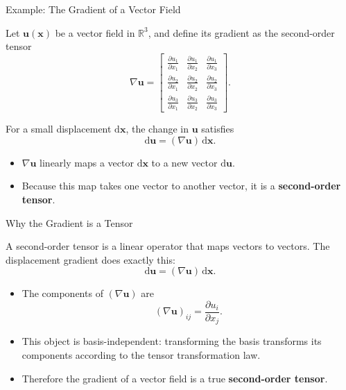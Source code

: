 \documentclass{beamer}
\begin{document}
\begin{frame}{Example: The Gradient of a Vector Field}

Let $\mathbf{u}(\mathbf{x})$ be a vector field in $\mathbb{R}^3$, and define its
gradient as the second-order tensor
\[
\nabla \mathbf{u} 
= 
\begin{bmatrix}
\frac{\partial u_1}{\partial x_1} &
\frac{\partial u_1}{\partial x_2} &
\frac{\partial u_1}{\partial x_3} \\[6pt]
\frac{\partial u_2}{\partial x_1} &
\frac{\partial u_2}{\partial x_2} &
\frac{\partial u_2}{\partial x_3} \\[6pt]
\frac{\partial u_3}{\partial x_1} &
\frac{\partial u_3}{\partial x_2} &
\frac{\partial u_3}{\partial x_3}
\end{bmatrix}.
\]

For a small displacement $\mathrm{d}\mathbf{x}$, the change in $\mathbf{u}$ satisfies
\[
\mathrm{d}\mathbf{u}
= (\nabla \mathbf{u})\, \mathrm{d}\mathbf{x}.
\]

\vspace{0.2cm}
\begin{itemize}
\item $\nabla \mathbf{u}$ linearly maps a vector $\mathrm{d}\mathbf{x}$ to a new vector $\mathrm{d}\mathbf{u}$.
\item Because this map takes one vector to another vector, it is a \textbf{second-order tensor}.
\end{itemize}

\end{frame}

\begin{frame}{Why the Gradient is a Tensor}

A second-order tensor is a linear operator that maps vectors to vectors.  
The displacement gradient does exactly this:
\[
\mathrm{d}\mathbf{u} = (\nabla \mathbf{u})\,\mathrm{d}\mathbf{x}.
\]

\begin{itemize}
\item The components of $(\nabla \mathbf{u})$ are
\[
(\nabla \mathbf{u})_{ij} = 
\frac{\partial u_i}{\partial x_j}.
\]
\item This object is basis-independent: transforming the basis transforms its components according to the tensor transformation law.
\item Therefore the gradient of a vector field is a true \textbf{second-order tensor}.
\end{itemize}

\end{frame}
\end{document}

